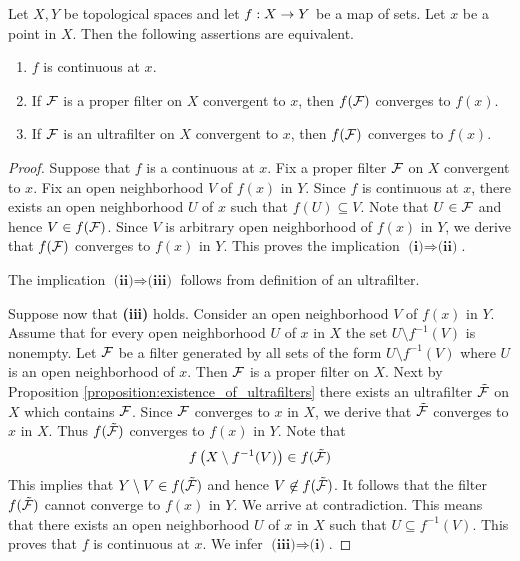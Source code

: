 \begin{proposition}\label{proposition:characterization_of_continuous_maps_in_terms_of_filters}
	Let $X,Y$ be topological spaces and let $f:X\rightarrow Y$ be a map of sets. Let $x$ be a point in $X$. Then the following assertions are equivalent.
	\begin{enumerate}[label=\emph{\textbf{(\roman*)}}, leftmargin=*]
		\item $f$ is continuous at $x$.
		\item If ${\mathcal F}$ is a proper filter on $X$ convergent to $x$, then $f({\mathcal F})$ converges to $f(x)$.
		\item If ${\mathcal F}$ is an ultrafilter on $X$ convergent to $x$, then $f({\mathcal F})$ converges to $f(x)$.
	\end{enumerate}
\end{proposition}
\begin{proof}
	Suppose that $f$ is a continuous at $x$. Fix a proper filter ${\mathcal F}$ on $X$ convergent to $x$. Fix an open neighborhood $V$ of $f(x)$ in $Y$. Since $f$ is continuous at $x$, there exists an open neighborhood $U$ of $x$ such that $f(U) \subseteq V$. Note that $U \in {\mathcal F}$ and hence $V \in f({\mathcal F})$. Since $V$ is arbitrary open neighborhood of $f(x)$ in $Y$, we derive that $f({\mathcal F})$ converges to $f(x)$ in $Y$. This proves the implication $\textbf{(i)}\Rightarrow \textbf{(ii)}$.

	The implication $\textbf{(ii)}\Rightarrow \textbf{(iii)}$ follows from definition of an ultrafilter.

	Suppose now that \textbf{(iii)} holds. Consider an open neighborhood $V$ of $f(x)$ in $Y$. Assume that for every open neighborhood $U$ of $x$ in $X$ the set $U\setminus f^{-1}(V)$ is nonempty. Let ${\mathcal F}$ be a filter generated by all sets of the form $U\setminus f^{-1}(V)$ where $U$ is an open neighborhood of $x$. Then ${\mathcal F}$ is a proper filter on $X$. Next by Proposition \ref{proposition:existence_of_ultrafilters} there exists an ultrafilter $\tilde{{\mathcal F}}$ on $X$ which contains ${\mathcal F}$. Since ${\mathcal F}$ converges to $x$ in $X$, we derive that $\tilde{{\mathcal F}}$ converges to $x$ in $X$. Thus $f(\tilde{{\mathcal F}})$ converges to $f(x)$ in $Y$. Note that
	$$f\left(X\setminus f^{-1}(V)\right) \in f(\tilde{{\mathcal F}})$$
	This implies that $Y\setminus V \in f(\tilde{{\mathcal F}})$ and hence $V \not \in f(\tilde{{\mathcal F}})$. It follows that the filter $f(\tilde{{\mathcal F}})$ cannot converge to $f(x)$ in $Y$. We arrive at contradiction. This means that there exists an open neighborhood $U$ of $x$ in $X$ such that $U \subseteq f^{-1}(V)$. This proves that $f$ is continuous at $x$. We infer $\textbf{(iii)}\Rightarrow \textbf{(i)}$.
\end{proof}

